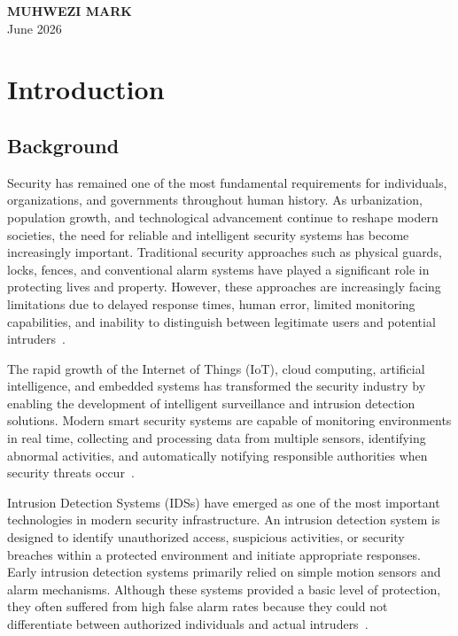 \documentclass[12pt,a4paper,oneside]{report}
\begin{document}
\vspace{1.5cm}
\noindent\textbf{MUHWEZI MARK}\\
June 2026

\clearpage
\listoffigures
{}

\clearpage
\listoftables
{}

\clearpage
\tableofcontents

\clearpage
\chapter{Introduction}

\section{Background}

Security has remained one of the most fundamental requirements for individuals, organizations, and governments throughout human history. As urbanization, population growth, and technological advancement continue to reshape modern societies, the need for reliable and intelligent security systems has become increasingly important. Traditional security approaches such as physical guards, locks, fences, and conventional alarm systems have played a significant role in protecting lives and property. However, these approaches are increasingly facing limitations due to delayed response times, human error, limited monitoring capabilities, and inability to distinguish between legitimate users and potential intruders~\cite{ref1,ref2}.

The rapid growth of the Internet of Things (IoT), cloud computing, artificial intelligence, and embedded systems has transformed the security industry by enabling the development of intelligent surveillance and intrusion detection solutions. Modern smart security systems are capable of monitoring environments in real time, collecting and processing data from multiple sensors, identifying abnormal activities, and automatically notifying responsible authorities when security threats occur~\cite{ref3,ref4}.

Intrusion Detection Systems (IDSs) have emerged as one of the most important technologies in modern security infrastructure. An intrusion detection system is designed to identify unauthorized access, suspicious activities, or security breaches within a protected environment and initiate appropriate responses. Early intrusion detection systems primarily relied on simple motion sensors and alarm mechanisms. Although these systems provided a basic level of protection, they often suffered from high false alarm rates because they could not differentiate between authorized individuals and actual intruders~\cite{ref5,ref6}.
\end{document}
